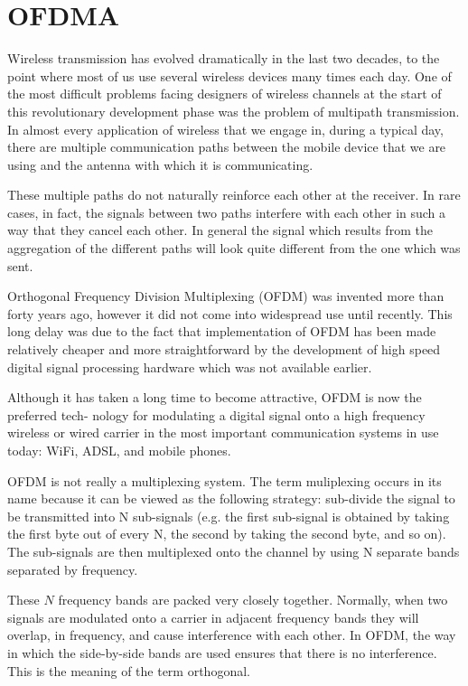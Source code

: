 \section{OFDMA}

Wireless transmission has evolved dramatically in the last two decades, to the point where
most of us use several wireless devices many times each day. One of the most difficult
problems facing designers of wireless channels at the start of this revolutionary development
phase was the problem of multipath transmission. In almost every application of wireless
that we engage in, during a typical day, there are multiple communication paths between the
mobile device that we are using and the antenna with which it is communicating.

These multiple paths do not naturally reinforce each other at the receiver. In rare cases, in
fact, the signals between two paths interfere with each other in such a way that they cancel
each other. In general the signal which results from the aggregation of the different paths will
look quite different from the one which was sent.

Orthogonal Frequency Division Multiplexing (OFDM) \cite{LiStuber2006} was invented more than forty
years ago, however it did not come into widespread use until recently. This long delay was
due to the fact that implementation of OFDM has been made relatively cheaper and more
straightforward by the development of high speed digital signal processing hardware which
was not available earlier.

Although it has taken a long time to become attractive, OFDM is now the preferred tech-
nology for modulating a digital signal onto a high frequency wireless or wired carrier in the
most important communication systems in use today: WiFi, ADSL, and mobile phones.

OFDM is not really a multiplexing system. The term muliplexing occurs in its name because
it can be viewed as the following strategy: sub-divide the signal to be transmitted into N
sub-signals (e.g. the first sub-signal is obtained by taking the first byte out of every N, the
second by taking the second byte, and so on). The sub-signals are then multiplexed onto the
channel by using N separate bands separated by frequency.

These $N$ frequency bands are packed very closely together. Normally, when two signals are
modulated onto a carrier in adjacent frequency bands they will overlap, in frequency, and
cause interference with each other. In OFDM, the way in which the side-by-side bands are
used ensures that there is no interference. This is the meaning of the term orthogonal.

